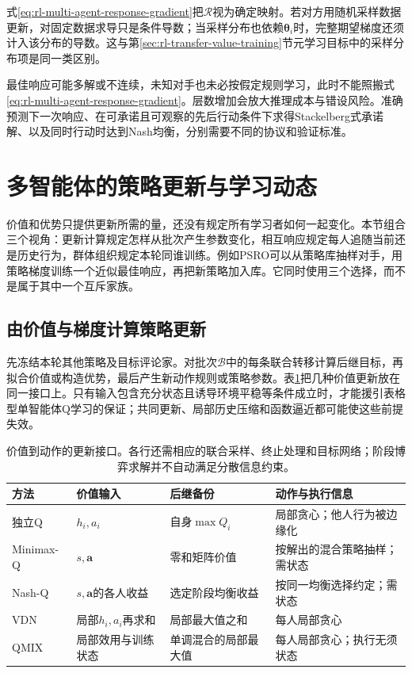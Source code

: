 式\eqref{eq:rl-multi-agent-response-gradient}把$\mathcal R$视为确定映射。若对方用随机采样数据更新，对固定数据求导只是条件导数；当采样分布也依赖$\bm\theta_i$时，完整期望梯度还须计入该分布的导数。这与第\ref{sec:rl-transfer-value-training}节元学习目标中的采样分布项是同一类区别。

最佳响应可能多解或不连续，未知对手也未必按假定规则学习，此时不能照搬式\eqref{eq:rl-multi-agent-response-gradient}。层数增加会放大推理成本与错设风险。准确预测下一次响应、在可承诺且可观察的先后行动条件下求得Stackelberg式承诺解、以及同时行动时达到Nash均衡，分别需要不同的协议和验证标准。

\section{多智能体的策略更新与学习动态}
\label{sec:rl-multi-agent-learning}

价值和优势只提供更新所需的量，还没有规定所有学习者如何一起变化。本节组合三个视角：更新计算规定怎样从批次产生参数变化，相互响应规定每人追随当前还是历史行为，群体组织规定本轮同谁训练。例如PSRO可以从策略库抽样对手，用策略梯度训练一个近似最佳响应，再把新策略加入库。它同时使用三个选择，而不是属于其中一个互斥家族。

\subsection{由价值与梯度计算策略更新}
\label{sec:rl-multi-agent-update}

先冻结本轮其他策略及目标评论家。对批次$\mathcal B$中的每条联合转移计算后继目标，再拟合价值或构造优势，最后产生新动作规则或策略参数。表\ref{tab:rl-multi-agent-value-updates}把几种价值更新放在同一接口上。只有输入包含充分状态且诱导环境平稳等条件成立时，才能援引表格型单智能体Q学习的保证；共同更新、局部历史压缩和函数逼近都可能使这些前提失效。

\begin{table}[htbp]
 \centering
 \begin{tabularx}{\linewidth}{@{}l >{\raggedright\arraybackslash}X >{\raggedright\arraybackslash}X >{\raggedright\arraybackslash}X@{}}
 \toprule
 方法 & 价值输入 & 后继备份 & 动作与执行信息\\
 \midrule
 独立Q & $h_i,a_i$ & 自身$\max Q_i$ & 局部贪心；他人行为被边缘化\\
 Minimax-Q & $s,\bm a$ & 零和矩阵价值 & 按解出的混合策略抽样；需状态\\
 Nash-Q & $s,\bm a$的各人收益 & 选定阶段均衡收益 & 按同一均衡选择约定；需状态\\
 VDN & 局部$h_i,a_i$再求和 & 局部最大值之和 & 每人局部贪心\\
 QMIX & 局部效用与训练状态 & 单调混合的局部最大值 & 每人局部贪心；执行无须状态\\
 \bottomrule
 \end{tabularx}
 \caption{价值到动作的更新接口。各行还需相应的联合采样、终止处理和目标网络；阶段博弈求解并不自动满足分散信息约束。}
 \label{tab:rl-multi-agent-value-updates}
\end{table}

